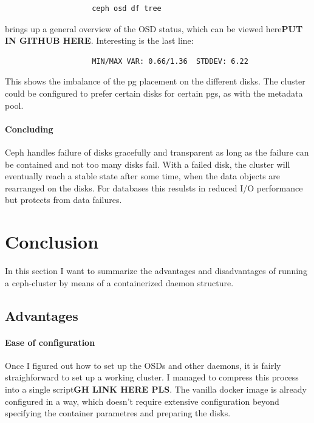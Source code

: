 \documentclass[titlepage, a4paper, 11pt]{scrartcl}
\begin{document}
                \begin{lstlisting}
                    ceph osd df tree
                \end{lstlisting}

                brings up a general overview of the OSD status, which can be viewed here\textbf{PUT IN GITHUB HERE}. Interesting is the last line:

                \begin{lstlisting}
                    MIN/MAX VAR: 0.66/1.36  STDDEV: 6.22
                \end{lstlisting}

                This shows the imbalance of the pg placement on the different disks. The cluster could be configured to prefer certain disks for certain pgs, as with the metadata pool.

                \paragraph{Concluding} Ceph handles failure of disks gracefully and transparent as long as the failure can be contained and not too many disks fail. With a failed disk, the cluster will eventually reach a stable state after some time, when the data objects are rearranged on the disks. For databases this resulsts in reduced I/O performance but protects from data failures.

    \section{Conclusion}\label{conclusion}

        In this section I want to summarize the advantages and disadvantages of running a ceph-cluster by means of a containerized daemon structure.

        \subsection{Advantages}

            \paragraph{Ease of configuration} Once I figured out how to set up the OSDs and other daemons, it is fairly straighforward to set up a working cluster. I managed to compress this process into a single script\textbf{GH LINK HERE PLS}. The vanilla docker image is already configured in a way, which doesn't require extensive configuration beyond specifying the container parametres and preparing the disks.
\end{document}
